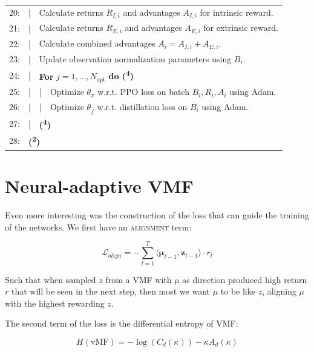 \begin{table}[H]
\begin{tabular}{rlll}
    20: & | & \multicolumn{2}{l}{Calculate returns $R_{I,i}$ and advantages $A_{I,i}$ for intrinsic reward.}\\
    21: & | & \multicolumn{2}{l}{Calculate returns $R_{E,i}$ and advantages $A_{E,i}$ for extrinsic reward.}\\
    22: & | & \multicolumn{2}{l}{Calculate combined advantages $A_{i} = A_{I,i} + A_{E,i}$.}\\
    23: & | & \multicolumn{2}{l}{Update observation normalization parameters using $B_{i}$.}\\
    24: & | & \multicolumn{2}{l}{\textbf{For} $j = 1, ..., N_{\text{opt}}$ \textbf{do (\textsuperscript{4})}}\\
    25: & | & | & Optimize $\theta_{\pi}$ w.r.t. PPO loss on batch $B_{i}, R_{i}, A_{i}$ using Adam.\\
    26: & | & | & Optimize $\theta_{\hat{f}}$ w.r.t. distillation loss on $B_{i}$ using Adam.\\
    27: & | & \multicolumn{2}{l}{\textbf{(\textsuperscript{4})}}\\
    28: & \multicolumn{3}{l}{\textbf{(\textsuperscript{2})}}\\
    \hline\hline
  \end{tabular}
\end{table}

\hypertarget{na-vmf}{\section{Neural-adaptive VMF}}

Even more interesting was the construction of the loss that can guide the training of the networks. We first have an \textsc{alignment} term:

\begin{equation}
    \mathcal{L}_{align} = - \sum_{t=1}^{T} \langle \boldsymbol{\mu}_{t-1}, \textbf{z}_{t-1} \rangle \cdot r_{t}
\end{equation}

Such that when sampled $z$ from a VMF with $\mu$ as direction produced high return $r$ that will be seen in the next step, then most we want $\mu$ to be like $z$, aligning $\mu$ with the highest rewarding $z$.

The second term of the loss is the differential entropy of VMF:

\begin{equation}
    H(\text{vMF}) = -\log(C_d(\kappa)) - \kappa A_d(\kappa)
\end{equation}

